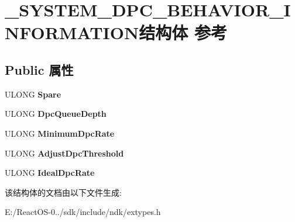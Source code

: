 \hypertarget{struct___s_y_s_t_e_m___d_p_c___b_e_h_a_v_i_o_r___i_n_f_o_r_m_a_t_i_o_n}{}\section{\+\_\+\+S\+Y\+S\+T\+E\+M\+\_\+\+D\+P\+C\+\_\+\+B\+E\+H\+A\+V\+I\+O\+R\+\_\+\+I\+N\+F\+O\+R\+M\+A\+T\+I\+O\+N结构体 参考}
\label{struct___s_y_s_t_e_m___d_p_c___b_e_h_a_v_i_o_r___i_n_f_o_r_m_a_t_i_o_n}
\subsection*{Public 属性}
\begin{DoxyCompactItemize}
\item 
\mbox{\label{struct___s_y_s_t_e_m___d_p_c___b_e_h_a_v_i_o_r___i_n_f_o_r_m_a_t_i_o_n_a952647c63b607885af139c2fcf4eed82}} 
U\+L\+O\+NG {\bfseries Spare}
\item 
\mbox{\label{struct___s_y_s_t_e_m___d_p_c___b_e_h_a_v_i_o_r___i_n_f_o_r_m_a_t_i_o_n_aa31317104f503ab67c72fa5aa118b995}} 
U\+L\+O\+NG {\bfseries Dpc\+Queue\+Depth}
\item 
\mbox{\label{struct___s_y_s_t_e_m___d_p_c___b_e_h_a_v_i_o_r___i_n_f_o_r_m_a_t_i_o_n_ab8c82029b27c9370205e0389283fe625}} 
U\+L\+O\+NG {\bfseries Minimum\+Dpc\+Rate}
\item 
\mbox{\label{struct___s_y_s_t_e_m___d_p_c___b_e_h_a_v_i_o_r___i_n_f_o_r_m_a_t_i_o_n_a579df138e247bb6cc6aaf6263b06b5a6}} 
U\+L\+O\+NG {\bfseries Adjust\+Dpc\+Threshold}
\item 
\mbox{\label{struct___s_y_s_t_e_m___d_p_c___b_e_h_a_v_i_o_r___i_n_f_o_r_m_a_t_i_o_n_a5c32efdd27b7f6ddd2caf689587185ff}} 
U\+L\+O\+NG {\bfseries Ideal\+Dpc\+Rate}
\end{DoxyCompactItemize}


该结构体的文档由以下文件生成\+:\begin{DoxyCompactItemize}
\item 
E\+:/\+React\+O\+S-\/0../sdk/include/ndk/extypes.\+h\end{DoxyCompactItemize}
